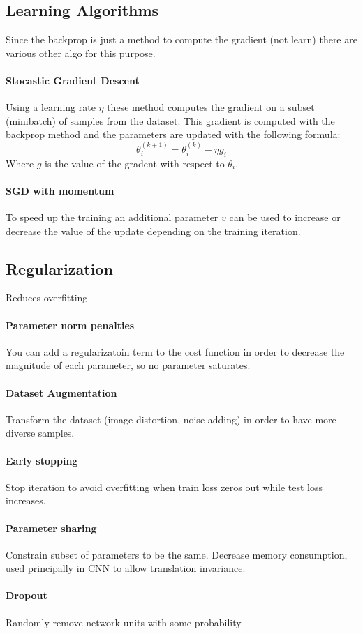 \subsection{Learning Algorithms}
Since the backprop is just a method to compute the gradient (not learn) there are various other algo for this purpose.

\paragraph{Stocastic Gradient Descent}
Using a learning rate $\eta$ these method computes the gradient on a subset (minibatch) of samples from the dataset. This gradient is computed with the backprop method and the parameters are updated with the following formula:
$$\theta_i^{(k+1)}=\theta_i^{(k)}-\eta g_i$$
Where $g$ is the value of the gradent with respect to $\theta_i$.

\paragraph{SGD with momentum}
To speed up the training an additional parameter $v$ can be used to increase or decrease the value of the update depending on the training iteration.

\subsection{Regularization}
Reduces overfitting

\paragraph{Parameter norm penalties}
You can add a regularizatoin term to the cost function in order to decrease the magnitude of each parameter, so no parameter saturates.

\paragraph{Dataset Augmentation}
Transform the dataset (image distortion, noise adding) in order to have more diverse samples.

\paragraph{Early stopping}
Stop iteration to avoid overfitting when train loss zeros out while test loss increases.

\paragraph{Parameter sharing}
Constrain subset of parameters to be the same. Decrease memory consumption, used principally in CNN to allow translation invariance.

\paragraph{Dropout}
Randomly remove network units with some probability.
